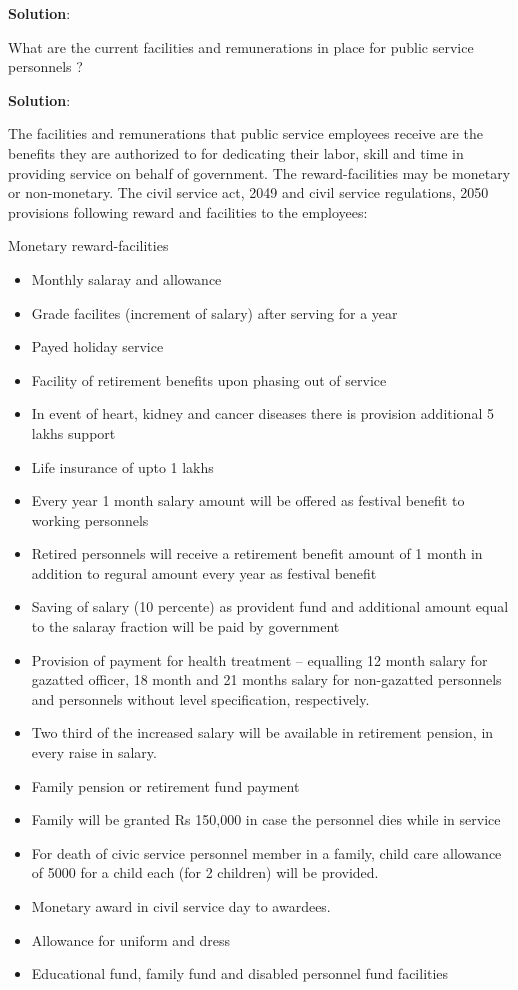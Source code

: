 \documentclass[
]{book}
\newcommand{\question}{\item}
\newenvironment{solution}{ {\bfseries Solution}:}{}
\begin{document}
\begin{questions}
\begin{solution}
\end{solution}

\question What are the current facilities and remunerations in place for public service personnels ?

\begin{solution}

The facilities and remunerations that public service employees receive are the benefits they are authorized to for dedicating their labor, skill and time in providing service on behalf of government. The reward-facilities may be monetary or non-monetary. The civil service act, 2049 and civil service regulations, 2050 provisions following reward and facilities to the employees:

Monetary reward-facilities

\begin{itemize}
\item Monthly salaray and allowance
\item Grade facilites (increment of salary) after serving for a year
\item Payed holiday service
\item Facility of retirement benefits upon phasing out of service
\item In event of heart, kidney and cancer diseases there is provision additional 5 lakhs support
\item Life insurance of upto 1 lakhs
\item Every year 1 month salary amount will be offered as festival benefit to working personnels
\item Retired personnels will receive a retirement benefit amount of 1 month in addition to regural amount every year as festival benefit
\item Saving of salary (10 percente) as provident fund and additional amount equal to the salaray fraction will be paid by government
\item Provision of payment for health treatment -- equalling 12 month salary for gazatted officer, 18 month and 21 months salary for non-gazatted personnels and personnels without level specification, respectively.
\item Two third of the increased salary will be available in retirement pension, in every raise in salary.
\item Family pension or retirement fund payment
\item Family will be granted Rs 150,000 in case the personnel dies while in service
\item For death of civic service personnel member in a family, child care allowance of 5000 for a child each (for 2 children) will be provided.
\item Monetary award in civil service day to awardees.
\item Allowance for uniform and dress
\item Educational fund, family fund and disabled personnel fund facilities
\end{itemize}


\end{solution}
\end{questions}
\end{document}
